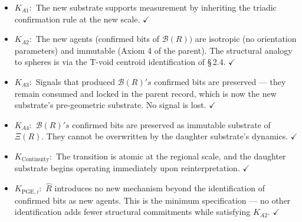 \documentclass[11pt,oneside]{report}
\theoremstyle{definition}
\theoremstyle{remark}
\begin{document}
\begin{itemize}
\item
  \ensuremath{K_{A1}:} The new substrate supports measurement by inheriting the
  triadic confirmation rule at the new scale. \ensuremath{\checkmark}
\end{itemize}

\begin{itemize}
\item
  \ensuremath{K_{A2}:} The new agents (confirmed bits of \ensuremath{\mathcal{B}(R))} are isotropic (no
  orientation parameters) and immutable (Axiom 4 of the parent). The
  structural analogy to spheres is via the T-void centroid
  identification of \S\,2.4. \ensuremath{\checkmark}
\end{itemize}

\begin{itemize}
\item
  \ensuremath{K_{A3}:} Signals that produced \ensuremath{\mathcal{B}(R)'s} confirmed bits are preserved ---
  they remain consumed and locked in the parent record, which is now the
  new substrate's pre-geometric substrate. No signal is lost. \ensuremath{\checkmark}
\end{itemize}

\begin{itemize}
\item
  \ensuremath{K_{A4}:} \ensuremath{\mathcal{B}(R)'s} confirmed bits are preserved as immutable substrate of
  \ensuremath{\Xi (R).} They cannot be overwritten by the daughter substrate's dynamics.
  \ensuremath{\checkmark}
\end{itemize}

\begin{itemize}
\item
  \ensuremath{K_{\mathrm{Continuity}}:} The transition is atomic at the regional scale, and the
  daughter substrate begins operating immediately upon reinterpretation.
  \ensuremath{\checkmark}
\end{itemize}

\begin{itemize}
\item
  \ensuremath{K_{\mathrm{PGE},i}:} \ensuremath{\hat{R}} introduces no new mechanism beyond the identification of
  confirmed bits as new agents. This is the minimum specification --- no
  other identification adds fewer structural commitments while
  satisfying \ensuremath{K_{A2}.} \ensuremath{\checkmark}
\end{itemize}
\end{document}
